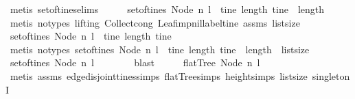 \begin{isabellebody}
\ {\isacharparenleft}metis\ set{\isacharunderscore}of{\isacharunderscore}tines{\isachardot}elims{\isacharparenright}\isanewline
\ \ \isamarkupfalse%
\ \isamarkupfalse%
\ {\isachardoublequoteopen}set{\isacharunderscore}of{\isacharunderscore}tines\ {\isacharparenleft}Node\ n\ l{\isacharparenright}\ {\isacharequal}\ {\isacharbraceleft}tine{\isachardot}\ length\ tine\ {\isacharequal}\ length\ {\isacharbrackleft}{\isacharbrackright}{\isacharbraceright}{\isachardoublequoteclose}\isanewline
\ \ \ \ \isamarkupfalse%
\ {\isacharparenleft}metis\ {\isacharparenleft}no{\isacharunderscore}types{\isacharcomma}\ lifting{\isacharparenright}\ Collect{\isacharunderscore}cong\ Leaf{\isacharunderscore}imp{\isacharunderscore}nil{\isacharunderscore}label{\isacharunderscore}tine\ assms\ list{\isachardot}size{\isacharparenleft}{}{\isacharparenright}{\isacharparenright}\isanewline
\ \ \isamarkupfalse%
\ \isamarkupfalse%
\ {\isachardoublequoteopen}set{\isacharunderscore}of{\isacharunderscore}tines\ {\isacharparenleft}Node\ n\ l{\isacharparenright}\ {\isacharequal}\ {\isacharbraceleft}tine{\isachardot}\ length\ tine\ {\isacharequal}\ {}{\isacharbraceright}{\isachardoublequoteclose}\isanewline
\ \ \ \ \isamarkupfalse%
\ {\isacharparenleft}metis\ {\isacharparenleft}no{\isacharunderscore}types{\isacharparenright}\ {\isacartoucheopen}set{\isacharunderscore}of{\isacharunderscore}tines\ {\isacharparenleft}Node\ n\ l{\isacharparenright}\ {\isacharequal}\ {\isacharbraceleft}tine{\isachardot}\ length\ tine\ {\isacharequal}\ length\ {\isacharbrackleft}{\isacharbrackright}{\isacharbraceright}{\isacartoucheclose}\ list{\isachardot}size{\isacharparenleft}{}{\isacharparenright}{\isacharparenright}\isanewline
\ \ \isamarkupfalse%
\ \isamarkupfalse%
\ {\isachardoublequoteopen}set{\isacharunderscore}of{\isacharunderscore}tines\ {\isacharparenleft}Node\ n\ l{\isacharparenright}\ {\isacharequal}\ {\isacharbraceleft}{\isacharbrackleft}{\isacharbrackright}{\isacharbraceright}{\isachardoublequoteclose}\isanewline
\ \ \ \ \isamarkupfalse%
\ blast\isanewline
\ \ \isamarkupfalse%
\ \isamarkupfalse%
\ {\isachardoublequoteopen}flatTree\ {\isacharparenleft}Node\ n\ l{\isacharparenright}{\isachardoublequoteclose}\isanewline
\ \ \ \ \isamarkupfalse%
\ {\isacharparenleft}metis\ assms\ edge{\isacharunderscore}disjoint{\isacharunderscore}tines{\isachardot}simps{\isacharparenleft}{}{\isacharparenright}\ flatTree{\isachardot}simps\ height{\isachardot}simps{\isacharparenleft}{}{\isacharparenright}\ list{\isachardot}size{\isacharparenleft}{}{\isacharparenright}\ singletonI{\isacharparenright}\isanewline

\end{isabellebody}
